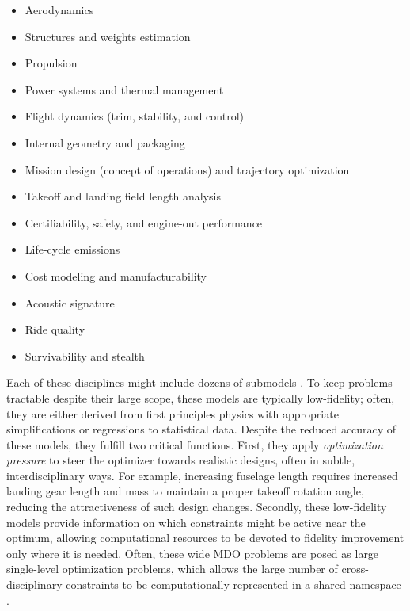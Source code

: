 \begin{multicols}{2}
    \begin{itemize}[noitemsep]
        \item Aerodynamics
        \item Structures and weights estimation
        \item Propulsion
        \item Power systems and thermal management
        \item Flight dynamics (trim, stability, and control)
        \item Internal geometry and packaging
        \item Mission design (concept of operations) and trajectory optimization
        \item Takeoff and landing field length analysis
        \item Certifiability, safety, and engine-out performance
        \item Life-cycle emissions
        \item Cost modeling and manufacturability
        \item Acoustic signature
        \item Ride quality
        \item Survivability and stealth
    \end{itemize}
\end{multicols}

Each of these disciplines might include dozens of submodels \cite{cruz_weight_1989, torenbeek_synthesis_1976, torenbeek_advanced_2013, drela_tasopt_2010}. To keep problems tractable despite their large scope, these models are typically low-fidelity; often, they are either derived from first principles physics with appropriate simplifications or regressions to statistical data. Despite the reduced accuracy of these models, they fulfill two critical functions. First, they apply \textit{optimization pressure} to steer the optimizer towards realistic designs, often in subtle, interdisciplinary ways. For example, increasing fuselage length requires increased landing gear length and mass to maintain a proper takeoff rotation angle, reducing the attractiveness of such design changes. Secondly, these low-fidelity models provide information on which constraints might be active near the optimum, allowing computational resources to be devoted to fidelity improvement only where it is needed. Often, these wide MDO problems are posed as large single-level optimization problems, which allows the large number of cross-disciplinary constraints to be computationally represented in a shared namespace \cite{hoburg_geometric_2014}.

